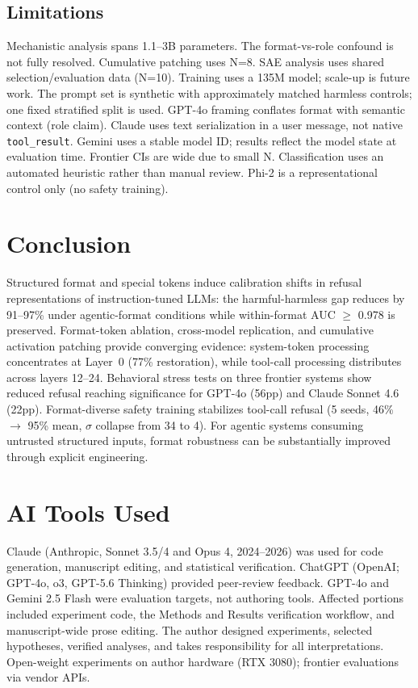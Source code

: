 \documentclass[conference]{IEEEtran}
\begin{document}
\subsection{Limitations}
\label{sec:limitations}

Mechanistic analysis spans 1.1--3B parameters. The format-vs-role confound is not fully resolved. Cumulative patching uses N=8. SAE analysis uses shared selection/evaluation data (N=10). Training uses a 135M model; scale-up is future work. The prompt set is synthetic with approximately matched harmless controls; one fixed stratified split is used. GPT-4o framing conflates format with semantic context (role claim). Claude uses text serialization in a user message, not native \texttt{tool\_result}. Gemini uses a stable model ID; results reflect the model state at evaluation time. Frontier CIs are wide due to small N. Classification uses an automated heuristic rather than manual review. Phi-2 is a representational control only (no safety training).

\section{Conclusion}

Structured format and special tokens induce calibration shifts in refusal representations of instruction-tuned LLMs: the harmful-harmless gap reduces by 91--97\% under agentic-format conditions while within-format AUC $\geq$ 0.978 is preserved. Format-token ablation, cross-model replication, and cumulative activation patching provide converging evidence: system-token processing concentrates at Layer~0 (77\% restoration), while tool-call processing distributes across layers 12--24. Behavioral stress tests on three frontier systems show reduced refusal reaching significance for GPT-4o (56pp) and Claude Sonnet 4.6 (22pp). Format-diverse safety training stabilizes tool-call refusal (5 seeds, 46\% $\to$ 95\% mean, $\sigma$ collapse from 34 to 4). For agentic systems consuming untrusted structured inputs, format robustness can be substantially improved through explicit engineering.

\section*{AI Tools Used}

Claude (Anthropic, Sonnet 3.5/4 and Opus 4, 2024--2026) was used for code generation, manuscript editing, and statistical verification. ChatGPT (OpenAI; GPT-4o, o3, GPT-5.6 Thinking) provided peer-review feedback. GPT-4o and Gemini 2.5 Flash were evaluation targets, not authoring tools. Affected portions included experiment code, the Methods and Results verification workflow, and manuscript-wide prose editing. The author designed experiments, selected hypotheses, verified analyses, and takes responsibility for all interpretations. Open-weight experiments on author hardware (RTX 3080); frontier evaluations via vendor APIs.
\end{document}
